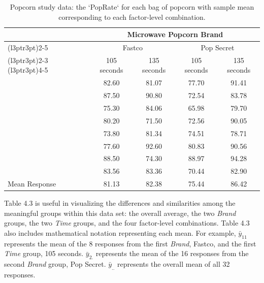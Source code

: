 \documentclass[
]{book}
\begin{document}
\begin{table}[!h]
\centering
\caption{\label{tab:tab42}Popcorn study data: the `PopRate` for each bag of popcorn with sample mean
corresponding to each factor-level combination.}
\centering
\begin{tabular}[t]{lcccc}
\toprule
\multicolumn{1}{c}{ } & \multicolumn{4}{c}{Microwave Popcorn Brand} \\
\cmidrule(l{3pt}r{3pt}){2-5}
\multicolumn{1}{c}{ } & \multicolumn{2}{c}{Fastco} & \multicolumn{2}{c}{Pop Secret} \\
\cmidrule(l{3pt}r{3pt}){2-3} \cmidrule(l{3pt}r{3pt}){4-5}
 & 105 seconds & 135 seconds & 105 seconds & 135 seconds\\
\midrule
 & 82.60 & 81.07 & 77.70 & 91.41\\
 & 87.50 & 90.80 & 72.54 & 83.78\\
 & 75.30 & 84.06 & 65.98 & 79.70\\
 & 80.20 & 71.50 & 72.56 & 90.05\\
 & 73.80 & 81.34 & 74.51 & 78.71\\
\addlinespace
 & 77.60 & 92.60 & 80.83 & 90.56\\
 & 88.50 & 74.30 & 88.97 & 94.28\\
 & 83.56 & 83.36 & 70.44 & 82.90\\
Mean Response & 81.13 & 82.38 & 75.44 & 86.42\\
\bottomrule
\end{tabular}
\end{table}

Table 4.3 is useful in visualizing the differences and similarities among the meaningful groups within this data set: the overall average, the two \emph{Brand} groups, the two \emph{Time} groups, and the four factor-level combinations. Table 4.3 also includes mathematical notation representing each mean. For example, \(\bar{y}_{11}\) represents the mean of the 8 responses from the first \emph{Brand}, Fastco, and the first \emph{Time} group, 105 seconds. \(\bar{y}_{2.}\) represents the mean of the 16 responses from the second \emph{Brand} group, Pop Secret. \(\bar{y}_{..}\) represents the overall mean of all 32 responses.
\end{document}
